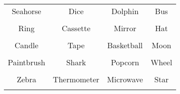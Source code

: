 \documentclass[12pt,a4paper]{article}
\begin{document}
\thispagestyle{empty}
\begin{table}[]
\centering
\Huge
\begin{tabular}{cccc}
 Seahorse& Dice& Dolphin& Bus\\  & & & \\
 Ring& Cassette& Mirror& Hat\\  & & & \\
 Candle& Tape& Basketball& Moon\\  & & & \\
 Paintbrush& Shark& Popcorn& Wheel\\  & & & \\
 Zebra& Thermometer& Microwave& Star\\  & & & \\
\end{tabular}
\end{table}
\end{document}
